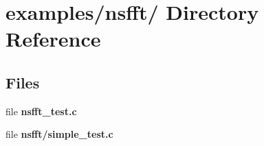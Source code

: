 \hypertarget{dir_000029}{
\section{examples/nsfft/ Directory Reference}
\label{dir_000029}
}
\subsection*{Files}
\begin{CompactItemize}
\item 
file {\bf nsfft\_\-test.c}
\item 
file {\bf nsfft/simple\_\-test.c}
\end{CompactItemize}
